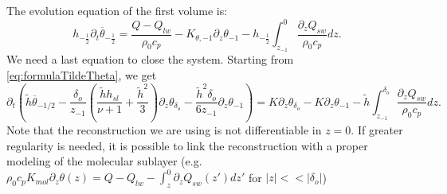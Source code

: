 The evolution equation of the first volume is:
\begin{equation}
h_{-\frac{1}{2}}\partial_t
\overline{\theta}_{-\frac{1}{2}} =
\frac{Q - Q_{lw}}{\rho_0 c_p}
- K_{\theta, -1} \partial_z \theta_{-1}
- h_{-\frac{1}{2}}\int_{z_{-1}}^0
\frac{\partial_z Q_{sw}}{\rho_0 c_p} dz.
\end{equation}
We need a last equation to close the system.
Starting from \eqref{eq:formulaTildeTheta}, we get
\begin{equation}
\partial_t
\left(
\widetilde{h}\overline{\theta}_{-1/2}
	-\frac{\delta_o}{z_{-1}}\left(
\frac{\widetilde{h}h_{sl}}{\nu+1} + \frac{\widetilde{h}^2}{3}
\right)\partial_z \theta_{\delta_o}
	- \frac{\widetilde{h}^2\delta_o}{6z_{-1}}
\partial_z \theta_{-1}
\right)
	= K\partial_z \theta_{\delta_o}-
K\partial_z \theta_{-1}
- \widetilde{h}
\int^{\delta_o}_{z_{-1}}
\frac{\partial_z Q_{sw}}{\rho_0 c_p} dz.
\end{equation}
Note that the reconstruction we are using is not differentiable
in $z=0$.
If greater regularity is needed, it is possible to link
the reconstruction with a proper modeling of the molecular sublayer
(e.g. $\rho_0 c_p K_{mol} \partial_z \theta(z) =
Q - Q_{lw} - \int_z^0 \partial_z Q_{sw}(z')dz'$ for $|z|<<|\delta_o|$)

